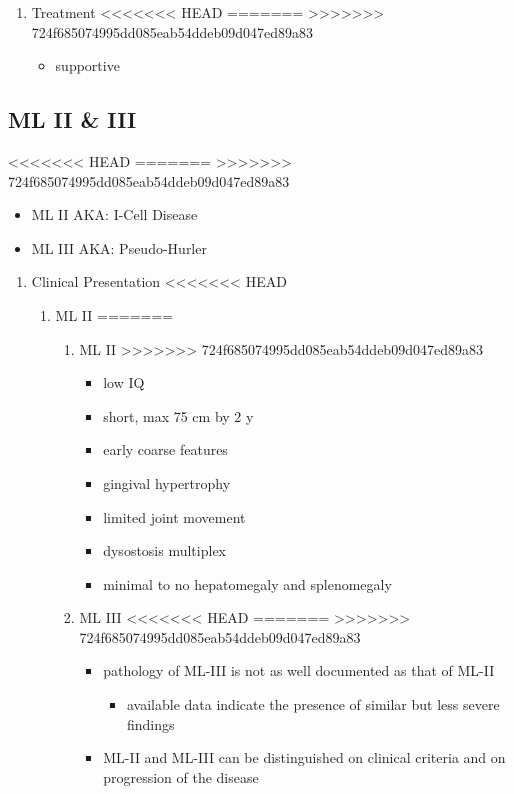 \documentclass[fontsize=12pt]{scrartcl}
\begin{document}
\begin{enumerate}
\begin{enumerate}
\begin{enumerate}
\begin{enumerate}
\begin{table}[htbp]
\begin{enumerate}
\begin{enumerate}
\begin{enumerate}
\begin{enumerate}
\begin{enumerate}
\begin{enumerate}
\item Treatment
<<<<<<< HEAD
\label{sec:orgbb56dd3}
=======
\label{sec:orgc035018}
>>>>>>> 724f685074995dd085eab54ddeb09d047ed89a83
\begin{itemize}
\item supportive
\end{itemize}
\end{enumerate}

\subsection{ML II \& III}
<<<<<<< HEAD
\label{sec:org385ccaf}
=======
\label{sec:orgfacf73d}
>>>>>>> 724f685074995dd085eab54ddeb09d047ed89a83
\begin{itemize}
\item ML II AKA: I-Cell Disease
\item ML III AKA: Pseudo-Hurler
\end{itemize}
\begin{enumerate}
\item Clinical Presentation
<<<<<<< HEAD
\label{sec:org5ff4163}
\begin{enumerate}
\item ML II
\label{sec:orgb6ac591}
=======
\label{sec:org0d0ef80}
\begin{enumerate}
\item ML II
\label{sec:orge72b518}
>>>>>>> 724f685074995dd085eab54ddeb09d047ed89a83
\begin{itemize}
\item low IQ
\item short, max 75 cm by 2 y
\item early coarse features
\item gingival hypertrophy
\item limited joint movement
\item dysostosis multiplex
\item minimal to no hepatomegaly and splenomegaly
\end{itemize}

\item ML III
<<<<<<< HEAD
\label{sec:orgc717568}
=======
\label{sec:orgaab9d1e}
>>>>>>> 724f685074995dd085eab54ddeb09d047ed89a83
\begin{itemize}
\item pathology of ML-III is not as well documented as that of ML-II
\begin{itemize}
\item available data indicate the presence of similar but less severe
findings
\end{itemize}
\item ML-II and ML-III can be distinguished on clinical criteria and on
progression of the disease
\end{itemize}
\end{enumerate}



\end{enumerate}
\end{enumerate}
\end{enumerate}
\end{enumerate}
\end{enumerate}
\end{enumerate}
\end{enumerate}
\end{table}
\end{enumerate}
\end{enumerate}
\end{enumerate}
\end{enumerate}
\end{document}
